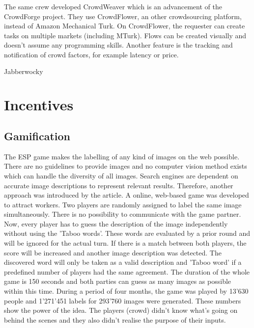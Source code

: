 The same crew developed CrowdWeaver\cite{crowdweaver} which is an advancement of the CrowdForge project. They use CrowdFlower, an other crowdsourcing platform, instead of Amazon Mechanical Turk. On CrowdFlower, the requester can create tasks on multiple markets (including MTurk). Flows can be created visually and doesn't assume any programming skills. Another feature is the tracking and notification of crowd factors, for example latency or price.

Jabberwocky

\section{Incentives}

\subsection{Gamification}
The ESP game\cite{esp} makes the labelling of any kind of images on the web possible. There are no guidelines to provide images and no computer vision method exists which can handle the diversity of all images. Search engines are dependent on accurate image descriptions to represent relevant results. Therefore, another approach was introduced by the article. A online, web-based game was developed to attract workers. Two players are randomly assigned to label the same image simultaneously. There is no possibility to communicate with the game partner. Now, every player has to guess the description of the image independently without using the 'Taboo words'. These words are evaluated by a prior round and will be ignored for the actual turn. If there is a match between both players, the score will be increased and another image description was detected. The discovered word will only be taken as a valid description and 'Taboo word' if a predefined number of players had the same agreement. The duration of the whole game is 150 seconds and both parties can guess as many images as possible within this time. 
During a period of four months, the game was played by 13'630 people and 1'271'451 labels for 293'760 images were generated. These numbers show the power of the idea. The players (crowd) didn't know what's going on behind the scenes and they also didn't realise the purpose of their inputs.

